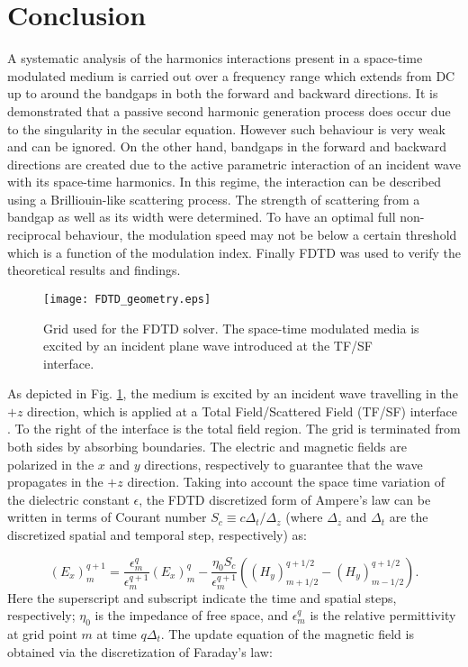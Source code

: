 \documentclass[journal]{IEEEtran}
\begin{document}
\section{Conclusion}

A systematic analysis of the harmonics interactions present in a space-time modulated medium is carried out over a frequency range which extends from DC up to around the bandgaps in both the forward and backward directions. It is demonstrated that a passive second harmonic generation process does occur due to the singularity in the secular equation. However such behaviour is very weak and can be ignored. On the other hand, bandgaps in the forward and backward directions are created due to the active parametric interaction of an incident wave with its space-time harmonics. In this regime, the interaction can be described using a Brilliouin-like scattering process. The strength of scattering from a bandgap as well as its width were determined. To have an optimal full non-reciprocal behaviour, the modulation speed may not be below a certain threshold which is a function of the modulation index. Finally FDTD was used to verify the theoretical results and findings.

\begin{figure}
\centering
\texttt{[image: FDTD\_geometry.eps]}
\caption{Grid used for the FDTD solver. The space-time modulated media is excited by an incident plane wave introduced at the TF/SF interface.}
\label{fig:FDTD_geometry}
\end{figure}
 As depicted in Fig. \ref{fig:FDTD_geometry}, the medium is excited by an incident wave travelling in the $+z$ direction, which is applied at a Total Field/Scattered Field (TF/SF) interface \cite{Schneider_Online, Taflove2000}. To the right of the interface is the total field region. The grid is terminated from both sides by absorbing boundaries. The electric and magnetic fields are polarized in the $x$ and $y$ directions, respectively to guarantee that the wave propagates in the $+z$ direction. Taking into account the space time variation of the dielectric constant $\epsilon$, the FDTD discretized form of Ampere's law can be written in terms of Courant number $S_c\equiv c\Delta_t/\Delta_z$ (where $\Delta_z$ and $\Delta_t$ are the discretized spatial and temporal step, respectively) as:
 
\small
\begin{equation*}
\left(E_x\right)^{q+1}_m=\frac{\epsilon^q_m}{\epsilon^{q+1}_m}\left(E_x\right)^q_m-\frac{\eta_0S_c}{\epsilon^{q+1}_m}\left(\left(H_y \right)^{q+1/2}_{m+1/2}-\left(H_y\right)^{q+1/2}_{m-1/2} \right).
\end{equation*}
\normalsize
Here the superscript  and subscript indicate the time and spatial steps, respectively; $\eta_0$ is the impedance of free space, and $\epsilon^q_m$ is the relative permittivity at grid point $m$ at time $q\Delta_t$. The update equation of the magnetic field is obtained via the discretization of Faraday's law:
\end{document}
